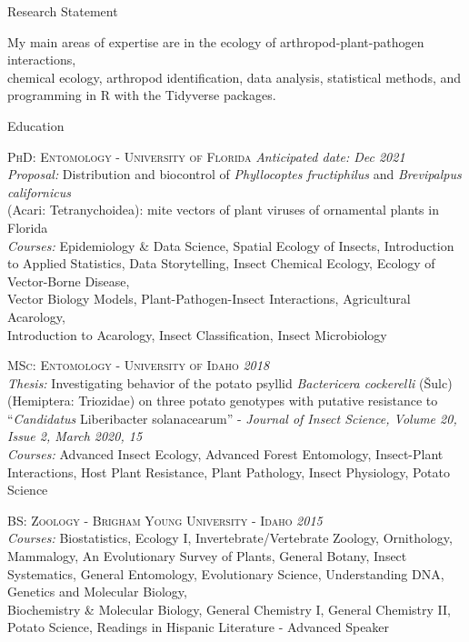 \documentclass{resume} %
\begin{document}
\begin{rSection}{Research Statement}

My main areas of expertise are in the ecology of arthropod-plant-pathogen interactions,\\ chemical ecology, arthropod identification, data analysis, statistical methods, and\\ programming in R with the Tidyverse packages.

\end{rSection}

\begin{rSection}{Education}
	
	\textsc{PhD: Entomology - University of Florida} \hfill {\em Anticipated date: Dec 2021}\\
	\textit{Proposal:} Distribution and biocontrol of \textit{Phyllocoptes fructiphilus} and \textit{Brevipalpus californicus}\\ (Acari: Tetranychoidea): mite vectors of plant viruses of ornamental plants in Florida \\
	\textit{Courses:} Epidemiology \& Data Science, Spatial Ecology of Insects, Introduction to Applied Statistics, Data Storytelling, Insect Chemical Ecology, Ecology of Vector-Borne Disease,\\
	Vector Biology Models, Plant-Pathogen-Insect Interactions, Agricultural Acarology,\\
	Introduction to Acarology, Insect Classification, Insect Microbiology\\ \hfill
	
	\textsc{MSc: Entomology - University of Idaho} \hfill {\em 2018}\\
	\textit{Thesis:} Investigating behavior of the potato psyllid \textit{Bactericera cockerelli} (Šulc) (Hemiptera: Triozidae) on three potato genotypes with putative resistance to “\textit{Candidatus} Liberibacter solanacearum” - \textit{Journal of Insect Science, Volume 20, Issue 2, March 2020, 15}\\
	\textit{Courses:} Advanced Insect Ecology, Advanced Forest Entomology,
	Insect-Plant Interactions, Host Plant Resistance, Plant Pathology, Insect Physiology, Potato Science\\ \hfill
	
	\textsc{BS: Zoology - Brigham Young University - Idaho} \hfill {\em 2015}\\ \textit{Courses:} Biostatistics, Ecology I, Invertebrate/Vertebrate Zoology, Ornithology, Mammalogy, An Evolutionary Survey of Plants, General Botany, Insect Systematics, General Entomology, Evolutionary Science, Understanding DNA, Genetics and Molecular Biology,\\ Biochemistry \& Molecular Biology, General Chemistry I, General Chemistry II,\\ Potato Science, Readings in Hispanic Literature - Advanced Speaker\\ \hfill
	
\end{rSection}
\end{document}
